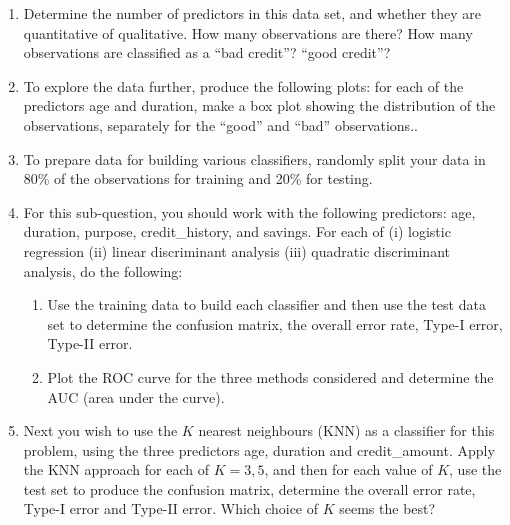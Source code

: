 \documentclass[11pt]{article}
\begin{document}
\begin{enumerate}
\item Determine the number of predictors in this data set, and whether they are quantitative of qualitative. How many observations are there? How many observations are classified as a ``bad credit''? ``good credit''? 
\item To explore the data further, produce the following plots: for each of the predictors age and duration, make a box plot showing the distribution of the observations, separately for the ``good'' and ``bad'' observations..
\item To prepare data for building various classifiers, randomly split your data in 80\% of the observations for training and 20\% for testing.
\item For this sub-question, you should work with the following predictors: age, duration, purpose, credit\_history, and savings. For each of (i) logistic regression 
(ii) linear discriminant analysis (iii) quadratic discriminant analysis, do the following:
  \begin{enumerate}
  \item Use the training data to build each classifier and then use the test data set to determine the confusion matrix, the overall error rate, Type-I error, Type-II error.
  \item Plot the ROC curve for the three methods considered and determine the AUC (area under the curve).
  \end{enumerate}
\item Next you wish to use the $K$ nearest neighbours (KNN) as a classifier for this problem, using the three predictors age, duration and credit\_amount. 
Apply the KNN approach for each of $K=3,5$, and then for each value of $K$, use the test set to produce the confusion matrix, determine the overall error rate, Type-I error and Type-II error. Which choice of $K$ seems the best?
 

\end{enumerate}
\end{document}
